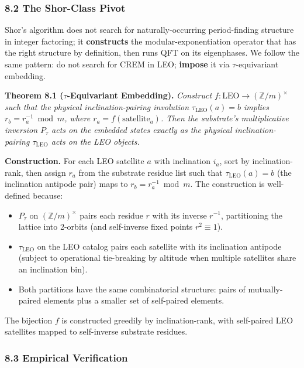 \documentclass[
]{article}
\providecommand{\tightlist}{%
  \setlength{\itemsep}{0pt}\setlength{\parskip}{0pt}}
\begin{document}
\subsubsection{8.2 The Shor-Class Pivot}\label{the-shor-class-pivot}

Shor's algorithm does not search for naturally-occurring period-finding
structure in integer factoring; it \textbf{constructs} the
modular-exponentiation operator that has the right structure by
definition, then runs QFT on its eigenphases. We follow the same
pattern: do not search for CREM in LEO; \textbf{impose} it via
\(\tau\)-equivariant embedding.

\textbf{Theorem 8.1 (\(\tau\)-Equivariant Embedding).} \emph{Construct
\(f: \text{LEO} \to (\mathbb{Z}/m)^\times\) such that the physical
inclination-pairing involution \(\tau_\text{LEO}(a) = b\) implies
\(r_b = r_a^{-1} \bmod m\), where \(r_a = f(\text{satellite}_a)\). Then
the substrate's multiplicative inversion \(P_\tau\) acts on the embedded
states exactly as the physical inclination-pairing \(\tau_\text{LEO}\)
acts on the LEO objects.}

\textbf{Construction.} For each LEO satellite \(a\) with inclination
\(i_a\), sort by inclination-rank, then assign \(r_a\) from the
substrate residue list such that \(\tau_\text{LEO}(a) = b\) (the
inclination antipode pair) maps to \(r_b = r_a^{-1} \bmod m\). The
construction is well-defined because:

\begin{itemize}
\tightlist
\item
  \(P_\tau\) on \((\mathbb{Z}/m)^\times\) pairs each residue \(r\) with
  its inverse \(r^{-1}\), partitioning the lattice into 2-orbits (and
  self-inverse fixed points \(r^2 \equiv 1\)).
\item
  \(\tau_\text{LEO}\) on the LEO catalog pairs each satellite with its
  inclination antipode (subject to operational tie-breaking by altitude
  when multiple satellites share an inclination bin).
\item
  Both partitions have the same combinatorial structure: pairs of
  mutually-paired elements plus a smaller set of self-paired elements.
\end{itemize}

The bijection \(f\) is constructed greedily by inclination-rank, with
self-paired LEO satellites mapped to self-inverse substrate residues.

\subsubsection{8.3 Empirical Verification}\label{empirical-verification}
\end{document}
